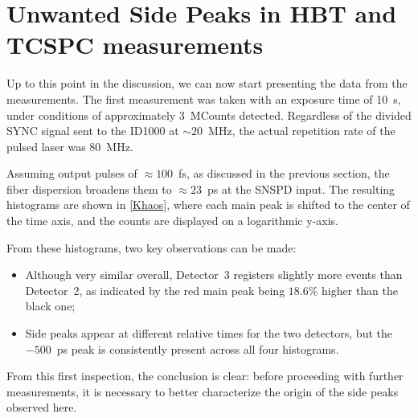 \section{Unwanted Side Peaks in HBT and TCSPC measurements}
\label{cpp:Initial-khaos}
Up to this point in the discussion, we can now start presenting the data from the measurements.  
The first measurement was taken with an exposure time of 10~s, under conditions of approximately 3~MCounts detected. Regardless of the divided SYNC signal sent to the ID1000 at $\sim 20$~MHz, the actual repetition rate of the pulsed laser was 80~MHz.  

Assuming output pulses of $\approx 100$~fs, as discussed in the previous section, the fiber dispersion broadens them to $\approx 23$~ps at the SNSPD input. The resulting histograms are shown in \autoref{Khaos}, where each main peak is shifted to the center of the time axis, and the counts are displayed on a logarithmic y-axis.  

From these histograms, two key observations can be made:  
\begin{itemize}
	\item Although very similar overall, Detector~3 registers slightly more events than Detector~2, as indicated by the red main peak being $18.6\%$ higher than the black one;
	\item Side peaks appear at different relative times for the two detectors, but the $-500$~ps peak is consistently present across all four histograms.
\end{itemize}

From this first inspection, the conclusion is clear: before proceeding with further measurements, it is necessary to better characterize the origin of the side peaks observed here.

